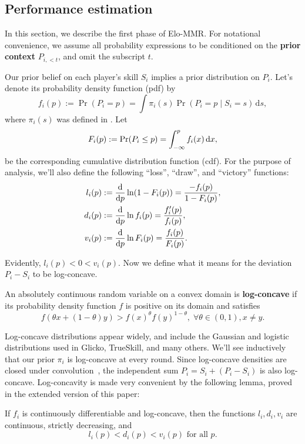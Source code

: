\subsection{Performance estimation}
\label{sec:performance}

In this section, we describe the first phase of Elo-MMR. For notational convenience, we assume all probability expressions to be conditioned on the \textbf{prior context} $P_{i,< t}$, and omit the subscript $t$.

Our prior belief on each player's skill $S_i$ implies a prior distribution on $P_i$. Let's denote its probability density function (pdf) by
\begin{equation}
\label{eq:perf-prior} 
f_i(p) := \Pr(P_i = p) = \int \pi_i(s) \Pr(P_i = p \mid S_i=s) \,\mathrm{d}s,
\end{equation}
where $\pi_i(s)$ was defined in . Let
\[F_i(p) := \Pr(P_i\le p) = \int_{-\infty}^p f_i(x) \,\mathrm{d}x,\]
be the corresponding cumulative distribution function (cdf). For the purpose of analysis, we'll also define the following ``loss'', ``draw'', and ``victory'' functions:
\begin{align*}
l_i(p) &:= \frac{\mathrm{d}}{\mathrm{d}p}\ln(1-F_i(p)) = \frac{-f_i(p)}{1 - F_i(p)},
\\d_i(p) &:= \frac{\mathrm{d}}{\mathrm{d}p}\ln f_i(p) = \frac{f'_i(p)}{f_i(p)},
\\v_i(p) &:= \frac{\mathrm{d}}{\mathrm{d}p}\ln F_i(p) = \frac{f_i(p)}{F_i(p)}.
\end{align*}

Evidently, $l_i(p) < 0 < v_i(p)$. Now we define what it means for the deviation $P_i - S_i$ to be log-concave.
\begin{definition}
\label{def:log-concave}
An absolutely continuous random variable on a convex domain is \textbf{log-concave} if its probability density function $f$ is positive on its domain and satisfies
\[f(\theta x + (1-\theta) y) > f(x)^\theta f(y)^{1-\theta},\;\forall\theta\in(0,1),x\neq y.\]
\end{definition}

Log-concave distributions appear widely, and include the Gaussian and logistic distributions used in Glicko, TrueSkill, and many others. We'll see inductively that our prior $\pi_i$ is log-concave at every round. Since log-concave densities are closed under convolution~\cite{concave}, the independent sum $P_i=S_i+(P_i-S_i)$ is also log-concave. Log-concavity is made very convenient by the following lemma, proved in the extended version of this paper:
\begin{lemma}
\label{lem:decrease}
If $f_i$ is continuously differentiable and log-concave, then the functions $l_i,d_i,v_i$ are continuous, strictly decreasing, and
\[l_i(p) < d_i(p) < v_i(p) \text{ for all }p.\]
\end{lemma}

